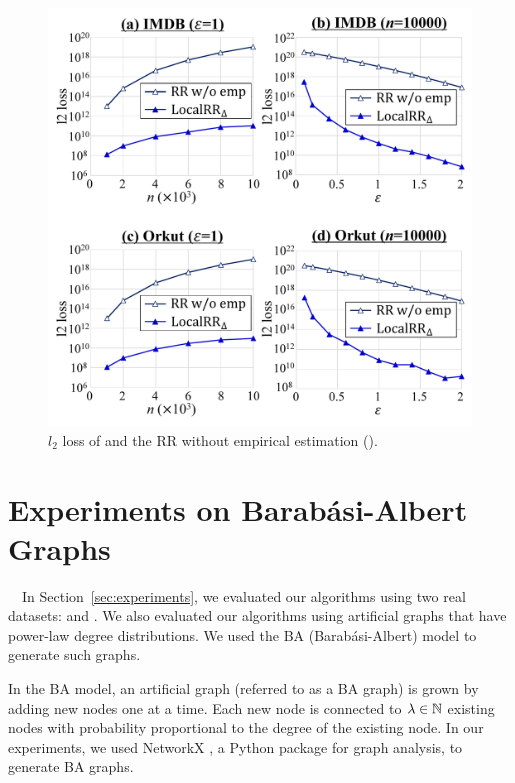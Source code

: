 \begin{figure}[t]
\centering
\includegraphics[width=0.99\linewidth]{fig/res5_RR_wo_emp.pdf}
\vspace{-5mm}
\caption{$l_2$ loss of  and the RR without empirical estimation ().}
\label{fig:res5_RR_wo_emp}
\end{figure}

\section{Experiments on Barab\'{a}si-Albert Graphs}
\label{sec:BAGraph}
{}~~In Section~\ref{sec:experiments}, we evaluated our algorithms using two real datasets: \IMDB{} and \Orkut{}. 
We also evaluated our algorithms using artificial graphs that have power-law degree distributions. 
We used the BA (Barab\'{a}si-Albert) model \cite{NetworkScience} to generate such graphs.

In the BA model, an artificial graph (referred to as a BA graph)
is grown by adding new nodes one at a time. 
Each new node is connected to $\lambda \in \mathbb{N}$ existing nodes with probability proportional to the degree of the existing node. 
In our experiments, we used 
NetworkX \cite{Hagberg_SciPy08}, a Python package for graph analysis, to generate BA graphs.

